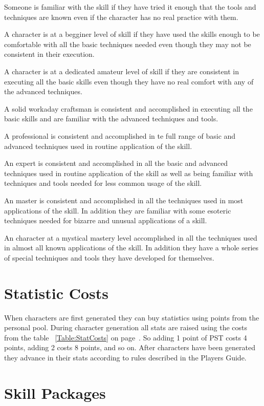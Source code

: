 Someone is familiar with the skill if they have tried it enough that the
tools and techniques are known even if the character has no real practice
with them.

A character is at a begginer level of skill if they have used the skills
enough to be comfortable with all the basic techniques needed even though
they may not be consistent in their execution.

A character is at a dedicated amateur level of skill if they are consistent
in executing all the basic skills even though they have no real comfort
with any of the advanced techniques.

A solid workaday craftsman is consistent and accomplished 
in executing all the basic skills and are familiar with the advanced
techniques and tools.

A professional is consistent and accomplished in te full range of
basic and advanced techniques used in routine application of the skill.

An expert is consistent and accomplished in all the basic and
advanced techniques used in routine application of the skill as well as
being familiar with techniques and tools needed for less common usage of
the skill.

An master is consistent and accomplished in all the techniques used in
most applications of the skill. In addition they are familiar with some
esoteric techniques needed for bizarre and unusual applications of a skill.

An character at a mystical mastery level accomplished in all the techniques used in
almost all known applications of the skill. In addition they have a whole
series of special techniques and tools they have developed for themselves.

\section{Statistic Costs}

When characters are first generated they can buy statistics 
using points from the personal pool. During character generation all stats
are raised using the costs from the table ~\ref{Table:StatCosts} on page~\pageref{Table:StatCosts}.
So adding 1 point of PST costs 4 points,  adding 2 costs 8 points, and so
on. After characters have been generated they advance in their stats
according to rules described in the Players Guide.



\section{Skill Packages}

